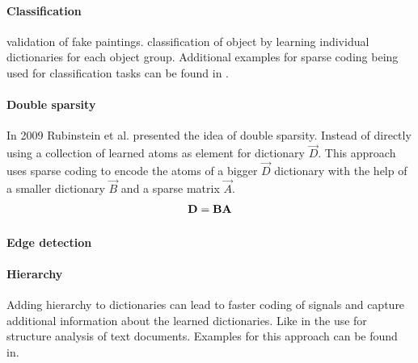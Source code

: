 
\paragraph{Classification} \cite{?} validation of fake paintings. 
\cite{?} classification of object by learning individual dictionaries for each
object group. Additional examples for sparse coding  being used for
classification tasks can be found in
\cite{Raina2007,BradleyBagnel2009,Mairal2008,Mairal2008b,Bar2009,Yang2009}.

\paragraph{Double sparsity}
In 2009 Rubinstein et al.\cite{Rubinstein2009} presented the idea of double
sparsity. Instead of directly using a collection of learned atoms as element for
dictionary $\vec{D}$. This approach uses sparse coding to encode the atoms of a
bigger $\vec{D}$ dictionary with the help of a smaller dictionary $\vec{B}$ and
a sparse matrix $\vec{A}$. 
\begin{align*}
\boldsymbol{\mathrm{D}}=\boldsymbol{\mathrm{B}}\boldsymbol{\mathrm{A}}
\end{align*}

\paragraph{Edge detection}\cite{Mairal2008c}

\paragraph{Hierarchy}
Adding hierarchy to dictionaries can lead to faster coding of signals and
capture additional information about the learned dictionaries. Like in the use
for structure analysis of text documents. Examples for this approach can be
found in\cite{Jenatton2010}.







